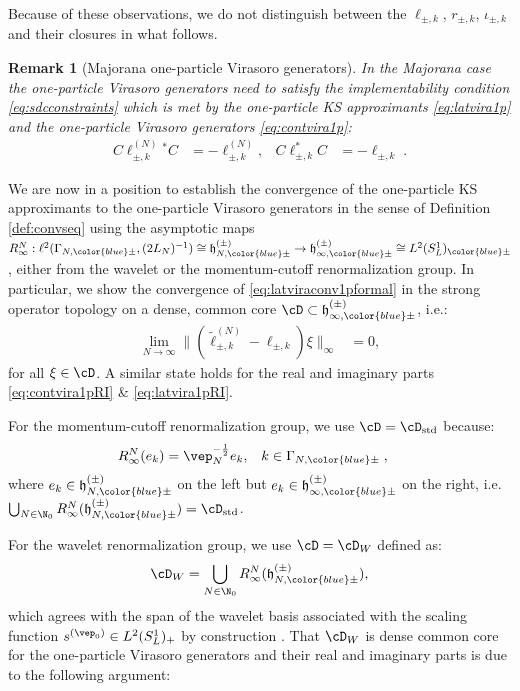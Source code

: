 \documentclass[a4paper, 11pt]{article}
\newcommand{\fh}{\mathfrak{h}}
\newcommand{\ltwo}{\ell^{2}}
\DeclareMathOperator{\1}{\mathds{1}}
\DeclareMathOperator{\std}{std}
\newtheorem{rem}[thm]{Remark}
\begin{document}
Because of these observations, we do not distinguish between the $\ell_{\pm,k}$, $r_{\pm,k}$, $\iota_{\pm,k}$ and their closures in what follows.

\begin{rem}[Majorana one-particle Virasoro generators]
\label{rem:impcond}
In the Majorana case the one-particle Virasoro generators need to satisfy the implementability condition \eqref{eq:sdcconstraints} which is met by the one-particle KS approximants \eqref{eq:latvira1p} and the one-particle Virasoro generators \eqref{eq:contvira1p}:
\begin{align}
\label{eq:impcondKS}
C\ell^{(N)}_{\pm,k}{}^{*}C & = -\ell^{(N)}_{\pm,k}, & C\ell_{\pm,k}^{*}C & = -\ell_{\pm,k} \;.
\end{align}
\end{rem}

We are now in a position to establish the convergence of the one-particle KS approximants to the one-particle Virasoro generators in the sense of Definition \ref{def:convseq} using the asymptotic maps $R^{N}_{\infty}:\ltwo(\Gamma_{N,{\color{blue}\pm}},(2L_{N})^{-1})\cong\fh^{(\pm)}_{N,{\color{blue}\pm}}\rightarrow\fh^{(\pm)}_{\infty,{\color{blue}\pm}}\cong L^{2}(S^{1}_{L})_{{\color{blue}\pm}}$, either from the wavelet or the momentum-cutoff renormalization group. In particular, we show the convergence of \eqref{eq:latviraconv1pformal} in the strong operator topology on a dense, common core $\cD\subset\fh^{(\pm)}_{\infty,{\color{blue}\pm}}$, i.e.:
\begin{align}
\label{eq:latviraconv1p}
\lim_{N\rightarrow\infty}\|(\tilde{\ell}^{(N)}_{\pm,k} - \ell_{\pm,k})\xi\|_{\infty} & = 0,
\end{align}
for all $\xi\in\cD$. A similar state holds for the real and imaginary parts \eqref{eq:contvira1pRI} \& \eqref{eq:latvira1pRI}.

\medskip

For the momentum-cutoff renormalization group, we use $\cD=\cD_{\std}$ because:
\begin{align}
\label{eq:momdominv}
R^{N}_{\infty}(e_{k}) & = \vep_{N}^{-\frac{1}{2}}e_{k}, & k&\in\Gamma_{N,{\color{blue}\pm}}\;,
\end{align}
where $e_{k}\in\fh^{(\pm)}_{N,{\color{blue}\pm}}$ on the left but $e_{k}\in\fh^{(\pm)}_{\infty,{\color{blue}\pm}}$ on the right, i.e.~$\bigcup_{N\in\N_{0}}R^{N}_{\infty}(\fh^{(\pm)}_{N,{\color{blue}\pm}})=\cD_{\std}$.

\medskip

For the wavelet renormalization group, we use $\cD=\cD_{W}$ defined as:
\begin{align}
\label{eq:waveletdom}
\cD_{W} = \bigcup_{N\in\N_{0}}R^{N}_{\infty}(\fh^{(\pm)}_{N,{\color{blue}\pm}}),
\end{align}
which agrees with the span of the wavelet basis associated with the scaling function $s^{(\vep_{0})}\in L^{2}(S^{1}_{L})_{+}$ by construction \cite{DaubechiesTenLecturesOn}. That $\cD_{W}$ is dense common core for the one-particle Virasoro generators and their real and imaginary parts is due to the following argument: 
\end{document}
